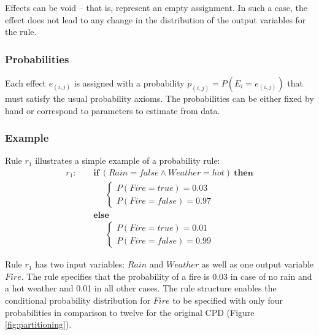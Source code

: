 Effects can be void -- that is, represent an empty assignment.  In such a case, the effect does not lead to any change in the distribution of the output variables for the rule. 

\subsubsection*{Probabilities}

Each effect $e_{(i,j)}$ is assigned with a probability $p_{(i,j)} = P(E_i = e_{(i,j)})$ that must satisfy the usual probability axioms.  The probabilities can be either fixed by hand or correspond to parameters to estimate from data.  %


\subsubsection*{Example}

Rule $r_1$ illustrates a simple example of a probability rule:
\begin{align*}
r_1: \ \ \ \ \ & \textbf{if} \ (\mathit{Rain}\!=\!\mathit{false} \land \mathit{Weather}\!=\!\mathit{hot}) \ \textbf{then} \\
& \;\;\;\;\;  \begin{cases}
 P(\mathit{Fire}\!=\!\mathit{true}) = 0.03 \\ 
P(\mathit{Fire}\!=\!\mathit{false}) = 0.97
\end{cases} \\ 
& \textbf{else} \\
& \;\;\;\;\; \begin{cases}
P(\mathit{Fire}\!=\!\mathit{true}) = 0.01 \\
P(\mathit{Fire}\!=\!\mathit{false}) = 0.99
\end{cases} 
\end{align*}

Rule $r_1$ has two input variables: $\mathit{Rain}$ and $\mathit{Weather}$ as well as one output variable $\mathit{Fire}$. The rule specifies that the probability of a fire is 0.03 in case of no rain and a hot weather and 0.01 in all other cases.  The rule structure enables the conditional probability distribution for $\mathit{Fire}$ to be specified with only four probabilities in comparison to twelve for the original CPD (Figure \ref{fig:partitioning}). 

